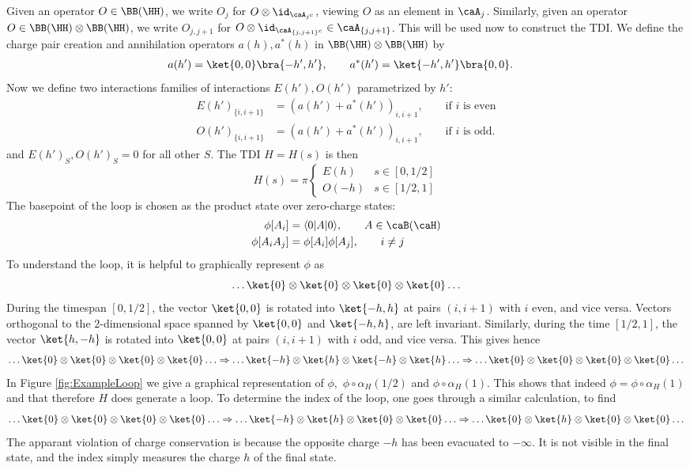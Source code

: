 Given an operator $ O \in \BB(\HH)$, we write $O_j$ for $O\otimes \id_{\caA_{j^c}}$, viewing $O$ as an element in $\caA_j$. Similarly, given an operator $O \in \BB(\HH) \otimes \BB(\HH) $, we write $O_{j,j+1}$ for $O\otimes \id_{\caA_{\{j,j+1\}^c}}\in\caA_{ \{j,j+1\}  }$. This will be used now to construct the TDI.
We define the charge pair creation and annihilation operators $a(h),a^*(h)$ in $\BB(\HH) \otimes \BB(\HH) $ by 
\begin{align}
	a(h')=\ket{0,0}\bra{-h',h'},\qquad  	a^*(h')&=\ket{-h',h'}\bra{0,0}.
\end{align}
Now we define two interactions families of interactions $E(h'),O(h')$ parametrized by $h'$:
\begin{align}
	E(h')_{\{i,i+1 \}} & =  (a(h')+a^*(h'))_{i,i+1},\qquad \text{if $i$ is even}     \\
	O(h')_{\{i,i+1 \}} & = (a(h')+a^*(h'))_{i,i+1},\qquad \text{if $i$ is odd}  .
\end{align}
and $E(h')_S,O(h')_S=0$ for all other $S$. 
The TDI  $H=H(s)$ is then 
\begin{equation}
	H(s)= 	\pi \begin{cases}
		E(h)& s\in[0,1/2]\\
		O(-h)&s \in[1/2,1]
	\end{cases}
\end{equation}
The basepoint of the loop is chosen as the product state over zero-charge states:
\begin{align}
	\phi[A_{i}]  & =    \langle 0| A |0\rangle,   \qquad A \in \caB(\caH)  \\
	\phi[A_{i}A_{j}] & =  \phi[A_{i}]  \phi[A_{j}],\qquad i\neq j  
\end{align}
To understand the loop, it is helpful to graphically represent $ \phi$ as 
$$
\ldots \ket{0} \otimes \ket{0}\otimes \ket{0} \otimes \ket{0}  \ldots 
$$
During the timespan $ [0,1/2]$, the vector $\ket{0,0}$ is rotated into $\ket{-h,h}$ at pairs $(i,i+1)$ with $i$ even, and vice versa. Vectors orthogonal to the $2$-dimensional space spanned by $\ket{0,0}$ and $\ket{-h,h}$, are left invariant. 
Similarly, during the time $ [1/2,1]$, the vector  $\ket{h,-h}$ is rotated into $\ket{0,0}$ at pairs $(i,i+1)$ with $i$ odd, and vice versa.
This gives hence
$$
\ldots \ket{0} \otimes \ket{0}\otimes \ket{0} \otimes \ket{0} \ldots  \Rightarrow   \ldots \ket{-h} \otimes \ket{h}\otimes \ket{-h} \otimes \ket{h} 
\ldots  \Rightarrow \ldots
\ket{0} \otimes \ket{0}\otimes \ket{0} \otimes \ket{0} \ldots
$$
In Figure \ref{fig:ExampleLoop} we give a graphical representation of $\phi,$ $\phi\circ\alpha_H(1/2)$ and $\phi\circ\alpha_H(1)$. This shows that indeed $\phi=\phi\circ\alpha_H(1)$ and that therefore $H$ does generate a loop. To determine the index of the loop, one goes through a similar calculation, to find
$$
\ldots \ket{0} \otimes \ket{0}\otimes \ket{0} \otimes \ket{0} \ldots \Rightarrow \ldots \ket{-h} \otimes \ket{h}\otimes \ket{0} \otimes \ket{0} 
\ldots \Rightarrow \ldots
\ket{0} \otimes \ket{h}\otimes \ket{0} \otimes \ket{0} \ldots 
$$
The apparant violation of charge conservation is because the opposite charge $-h$ has been evacuated to $-\infty$. It is not visible in the final state, and the index simply measures the charge $h$ of the final state.


